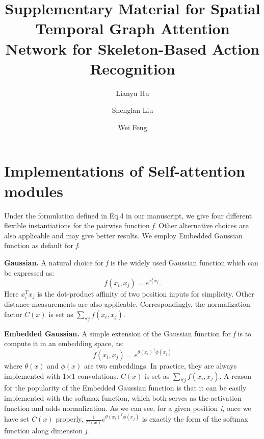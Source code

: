 \documentclass[runningheads]{llncs}
\begin{document}


\appendix

\title{Supplementary Material for Spatial Temporal Graph Attention Network for Skeleton-Based Action Recognition} 


\author{Lianyu Hu \and
Shenglan Liu \and
Wei Feng}
\maketitle

\section{Implementations of Self-attention modules}
Under the formulation defined in Eq.4 in our manuscript, we give four different flexible instantiations for the pairwise function \textit{f}. Other alternative choices are also applicable and may give better results. We employ Embedded Gaussian function as default for \textit{f}.

\textbf{Gaussian.} A natural choice for \textit{f} is the widely used Gaussian function which can be expressed as:
\begin{equation}
    \label{e6}
    f(x_{i},x_{j})= e^{x_{i}^{T}x_{j}}.
\end{equation}
Here $x_{i}^{T}x_{j}$ is the dot-product affinity of two position inputs for simplicity. Other distance measurements are also applicable. Correspondingly, the normalization factor $C(x)$ is set as $\sum_{\forall j} f(x_{i},x_{j})$.

\textbf{Embedded Gaussian.} A simple extension of the Gaussian function for \textit{f} is to compute it in an embedding space, as:
\begin{equation}
    \label{e7}
    f(x_{i},x_{j})= e^{\theta(x_{i})^{T}\phi(x_{j})}
\end{equation}
where $\theta(x)$ and $\phi(x)$ are two embeddings. In practice, they are always implemented with 1$\times$1 convolutions. $C(x)$ is set as $\sum_{\forall j} f(x_{i},x_{j})$. A reason for the popularity of the Embedded Gaussian function is that it can be easily implemented with the softmax function, which both serves as the activation function and adds normalization. As we can see, for a given position \textit{i}, once we have set $C(x)$ properly, $\frac{1}{C(x)}e^{\theta(x_{i})^{T}\phi(x_{j})}$ is exactly the form of the softmax function along dimension \textit{j}.
\end{document}
